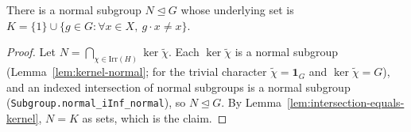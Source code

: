 \begin{theorem}
    \label{thm:frobenius-kernel-normal}
    There is a normal subgroup $N \trianglelefteq G$ whose underlying set is
    $K = \{1\} \cup \{ g \in G : \forall x \in X,\ g \cdot x \neq x\}$.
\end{theorem}
\begin{proof}
    Let $N = \bigcap_{\chi \in \mathrm{Irr}(H)} \ker \widetilde{\chi}$. Each
    $\ker\widetilde{\chi}$ is a normal subgroup
    (Lemma~\ref{lem:kernel-normal}; for the trivial character $\widetilde\chi =
    \mathbf 1_G$ and $\ker\widetilde\chi = G$), and an indexed intersection of
    normal subgroups is a normal subgroup
    (\texttt{Subgroup.normal\_iInf\_normal}), so $N \trianglelefteq G$. By
    Lemma~\ref{lem:intersection-equals-kernel}, $N = K$ as sets, which is the
    claim.
\end{proof}
